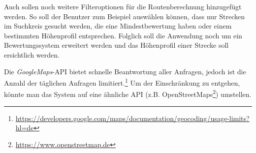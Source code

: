 \documentclass[a4paper,11pt,utf8]{scrartcl}
\begin{document}
Auch sollen noch weitere Filteroptionen für die Routenberechnung hinzugefügt werden. So soll der Benutzer zum Beispiel auswählen können, dass nur Strecken im Suchkreis gesucht werden, die eine Mindestbewertung haben oder einem bestimmten Höhenprofil entsprechen. Folglich soll die Anwendung noch um ein Bewertungssystem erweitert werden und das Höhenprofil einer Strecke soll ersichtlich werden.

Die \textit{GoogleMaps}-API bietet schnelle Beantwortung aller Anfragen, jedoch ist die Anzahl der täglichen Anfragen limitiert.\footnote{\url{https://developers.google.com/maps/documentation/geocoding/usage-limits?hl=de}} Um der Einschränkung zu entgehen, könnte man das System auf eine ähnliche API (z.B. OpenStreetMaps\footnote{\url{https://www.openstreetmap.de}}) umstellen.
\end{document}
